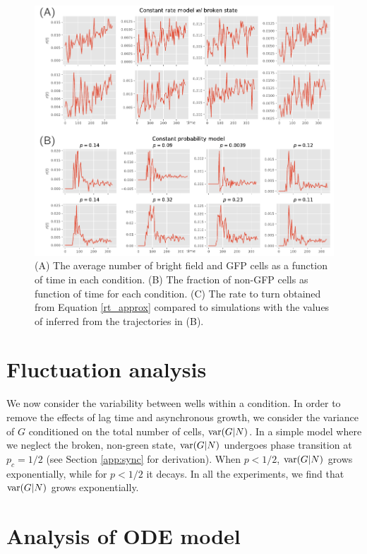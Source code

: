 \documentclass{article}
\begin{document}
\begin{figure}[h!]
\centering
\includegraphics[scale=0.8]{fig2.pdf}
\caption{(A) The average number of bright field and GFP cells as a function of time in each condition.  (B) The fraction of non-GFP cells as function of time for each condition.  (C) The rate to turn obtained from Equation \ref{rt_approx} compared to simulations with the values of inferred from the trajectories in (B). }\label{fig:1}
\end{figure}


\section{Fluctuation analysis}
We now consider the variability between wells within a condition. In order to remove the effects of lag time and asynchronous  growth, we consider the variance  of $G$ conditioned on the total number of cells, ${\rm var}(G|N)$. In a simple model where we neglect the broken, non-green state, ${\rm var}(G|N)$ undergoes phase transition at $p_c = 1/2$ (see Section \ref{app:sync} for derivation). When $p<1/2$, ${\rm var}(G|N)$ grows exponentially, while for $p<1/2$ it decays. In all the experiments, we find that ${\rm var}(G|N)$ grows exponentially. 

\newpage

\appendix

\section{Analysis of ODE model}\label{app:ode}
\end{document}
